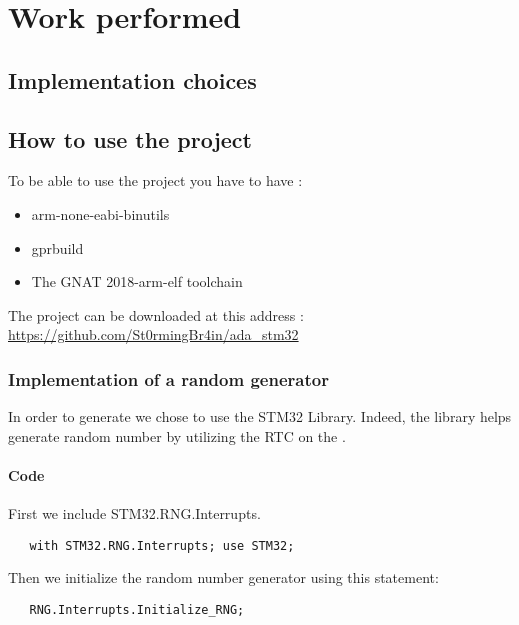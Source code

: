 \section{Work performed}

\subsection{Implementation choices}

\subsection{How to use the project}

To be able to use the project you have to have :
\begin{itemize}
    \item arm-none-eabi-binutils
    \item gprbuild
    \item The GNAT 2018-arm-elf toolchain
\end{itemize}

\begin{noindent}
The project can be downloaded at this address : \\
\url{https://github.com/St0rmingBr4in/ada_stm32}
\end{noindent}

\newpage

\subsubsection{Implementation of a random \sq generator}

In order to generate \sqs we chose to use the STM32 Library.
Indeed, the library helps generate random number by utilizing the RTC on the \stmdb.

\paragraph{Code}

\noindent
First we include STM32.RNG.Interrupts.
\begin{lstlisting}
   with STM32.RNG.Interrupts; use STM32;
\end{lstlisting}


\noindent
Then we initialize the random number generator using this statement:
\begin{lstlisting}
   RNG.Interrupts.Initialize_RNG;
\end{lstlisting}


